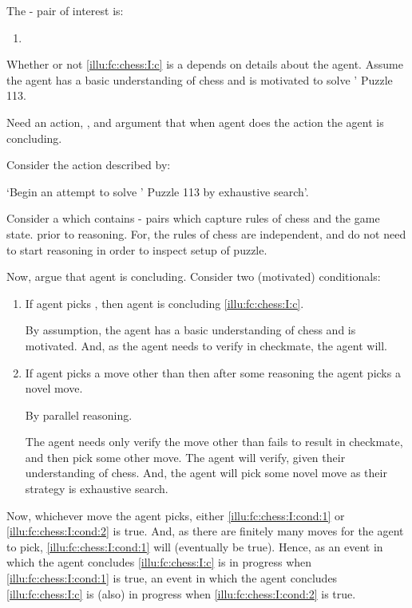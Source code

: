 \begin{note}
  The - pair of interest is:

  \begin{enumerate}[label=C\thescenarioCounter., ref=(C\thescenarioCounter)]
  \item
    \label{illu:fc:chess:I:c}
  \end{enumerate}
  Whether or not \ref{illu:fc:chess:I:c} is a \fc{} depends on details about the agent.
  Assume the agent has a basic understanding of chess and is motivated to solve \citeauthor{Emms:2000aa}' Puzzle 113.

  Need an action, \pool{}, and argument that when agent does the action the agent is concluding.

  Consider the action described by:

  \begin{center}
    `Begin an attempt to solve \citeauthor{Emms:2000aa}' Puzzle 113 by exhaustive search'.
  \end{center}

  Consider a \pool{} which contains - pairs which capture rules of chess and the game state.
  \pool{} prior to reasoning.
  For, the rules of chess are independent, and do not need to start reasoning in order to inspect setup of puzzle.

  Now, argue that agent is concluding.
  Consider two (motivated) conditionals:

  \begin{enumerate}[label=\arabic*., ref=(\arabic*)]
  \item
    \label{illu:fc:chess:I:cond:1}
    If agent picks , then agent is concluding \ref{illu:fc:chess:I:c}.%
    \smallskip

    By assumption, the agent has a basic understanding of chess and is motivated.
    And, as the agent needs to verify  in checkmate, the agent will.
  \item
    \label{illu:fc:chess:I:cond:2}
    If agent picks a move other than  then after some reasoning the agent picks a novel move.%
    \smallskip

    By parallel reasoning.

    The agent needs only verify the move other than  fails to result in checkmate, and then pick some other move.
    The agent will verify, given their understanding of chess.
    And, the agent will pick some novel move as their strategy is exhaustive search.
  \end{enumerate}
  Now, whichever move the agent picks, either \ref{illu:fc:chess:I:cond:1} or \ref{illu:fc:chess:I:cond:2} is true.
  And, as there are finitely many moves for the agent to pick, \ref{illu:fc:chess:I:cond:1} will (eventually be true).
  Hence, as an event in which the agent concludes \ref{illu:fc:chess:I:c} is in progress when \ref{illu:fc:chess:I:cond:1} is true, an event in which the agent concludes \ref{illu:fc:chess:I:c} is (also) in progress when \ref{illu:fc:chess:I:cond:2} is true.
\end{note}

